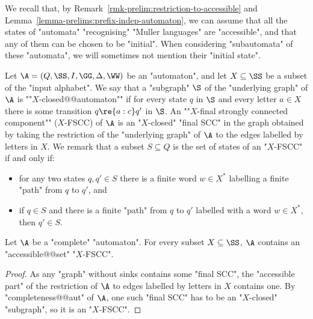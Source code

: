 \documentclass{theoretics}
\begin{document}
We recall that, by Remark~\ref{rmk-prelim:restriction-to-accessible} and Lemma~\ref{lemma-prelims:prefix-indep-automaton}, we can assume that all the states of "automata" "recognising" "Muller languages" are "accessible", and that any of them can be chosen to be "initial". When considering "subautomata" of these "automata", we will sometimes not mention their "initial state".

Let $\A = (Q, \SS, I, \GG, \Delta, \WW)$ be an "automaton", and let $X\subseteq \SS$ be a subset of the "input alphabet". 
\AP We say that a "subgraph" $\S$ of the "underlying graph" of $\A$ is ""$X$-closed@@automaton"" if for every state $q$ in $\S$ and every letter $a\in X$ there is some transition $q\re{a:c}q'$ in $\S$.
\AP An ""$X$-final strongly connected component"" ($X$-FSCC) of $\A$ is an "$X$-closed" "final SCC" in the graph obtained by taking the restriction of the "underlying graph" of $\A$ to the edges labelled by letters in $X$. We remark that a subset $S\subseteq Q$ is the set of states of an "$X$-FSCC" if and only if:
\begin{itemize}
	\item for any two states $q, q'\in S$ there is a finite word $w\in X^*$ labelling a finite "path" from $q$ to $q'$, and
	\item if $q\in S$ and there is a finite "path" from $q$ to $q'$ labelled with a word $w\in X^*$, then $q'\in S$.
\end{itemize}



\begin{lemma}\label{lemma-ZT:existance-X-FSCC}
	Let $\A$ be a "complete" "automaton". For every subset $X\subseteq \SS$, $\A$ contains an "accessible@@set" "$X$-FSCC".
\end{lemma}
\begin{proof}
	As any "graph" without sinks contains some "final SCC", the "accessible part" of the restriction of $\A$ to edges labelled by letters in $X$ contains one. By "completeness@@aut" of $\A$, one such "final SCC" has to be an "$X$-closed" "subgraph", so it is an "$X$-FSCC".
\end{proof}
\end{document}
